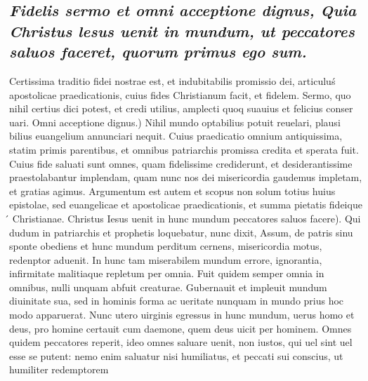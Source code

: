 \documentclass{article}
\begin{document}
\begin{pages}
\subsection*{\textit{Fidelis sermo et omni acceptione dignus, Quia Christus lesus uenit in mundum, ut peccatores saluos faceret, quorum primus ego sum. }}\pstart Certissima traditio fidei nostrae est, et indubitabilis promissio dei, articuluś apostolicae praedicationis, cuius fides Christianum facit, et fidelem. Sermo, quo nihil certius dici potest, et credi utilius, amplecti quoq suauius et felicius conser uari. Omni acceptione dignus.) Nihil mundo optabilius potuit reuelari, plausi bilius euangelium annunciari nequit. Cuius praedicatio omnium antiquissima, statim primis parentibus, et omnibus patriarchis promissa credita et sperata fuit. Cuius fide saluati sunt omnes, quam fidelissime crediderunt, et desiderantissime praestolabantur implendam, quam nunc nos dei misericordia gaudemus impletam, et gratias agimus. Argumentum est autem et scopus non solum totius huius epistolae, sed euangelicae et apostolicae praedicationis, et summa pietatis fideique ́ Christianae. Christus Iesus uenit in hunc mundum peccatores saluos facere). Qui dudum in patriarchis et prophetis loquebatur, nunc dixit, Assum, de patris sinu sponte obediens et hunc mundum perditum cernens, misericordia motus, redenptor aduenit. In hunc tam miserabilem mundum errore, ignorantia, infirmitate malitiaque repletum per omnia. Fuit quidem semper omnia in omnibus, nulli unquam abfuit creaturae. Gubernauit et impleuit mundum diuinitate sua, sed in hominis forma ac ueritate nunquam in mundo prius hoc modo apparuerat. Nunc utero uirginis egressus in hunc mundum, uerus homo et deus, pro homine certauit cum daemone, quem deus uicit per hominem. Omnes quidem peccatores reperit, ideo omnes saluare uenit, non iustos, qui uel sint uel esse se putent: nemo enim saluatur nisi humiliatus, et peccati sui conscius, ut humiliter redemptorem  \pend

\end{pages}
\end{document}
